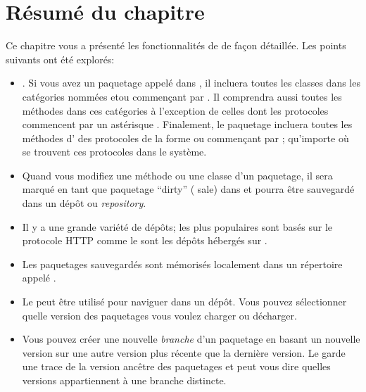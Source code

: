 \documentclass[a4paper,10pt,twoside]{book}
\begin{document}
\section{Résumé du chapitre}


Ce chapitre vous a présenté les fonctionnalités de \MC de façon
détaillée.
Les points suivants ont été explorés:

\begin{itemize}
\item \MC {}.
Si vous avez un paquetage appelé  dans \MC, il incluera toutes
les classes dans les catégories nommées   et\/ou commençant
par  . Il comprendra aussi toutes les méthodes dans ces
catégories à l'exception de celles dont les protocoles commencent par
un astérisque \ct{*}. 
Finalement, le paquetage incluera toutes les méthodes
d' des protocoles de la forme  
ou commençant par  ;  qu'importe où se trouvent ces
protocoles dans le système.

\item Quand vous modifiez une méthode ou une classe d'un paquetage, il
  sera marqué en tant que paquetage ``dirty'' (\ie{} sale) dans \MC et
  pourra être sauvegardé dans un dépôt ou \emph{repository}.

\item Il y a une grande variété de dépôts; les plus populaires sont
  basés sur le protocole HTTP comme le sont les dépôts hébergés sur
 \sqsrc.

\item Les paquetages sauvegardés sont mémorisés localement dans un
  répertoire appelé .

\item Le \MC \RI peut être utilisé pour naviguer dans un dépôt. Vous
  pouvez sélectionner quelle version des paquetages vous voulez
  charger ou décharger.

\item Vous pouvez créer une nouvelle \emph{branche} d'un paquetage
  en basant un nouvelle version sur une autre version plus récente que
  la dernière version. Le \RI garde une trace de la version ancêtre des
  paquetages et peut vous dire quelles versions appartiennent à une
  branche distincte.


\end{itemize}
\end{document}

